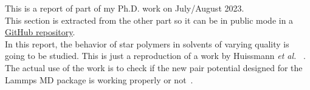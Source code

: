 This is a report of part of my Ph.D. work on July/August 2023.\\
This section is extracted from the other part so it can be in public mode in a \href{https://github.com/ReyhanehFarimani/LJLJ_potential.git}{GitHub repository}.\\
In this report, the behavior of star polymers in solvents of varying quality is going to be studied.
This is just a reproduction of a work by Huissmann \textit{et al.} ~\cite{Huissmann2009}. The actual use of the work is to check if the new pair potential designed for the Lammps MD package is working properly or not~\cite{LAMMPS}.